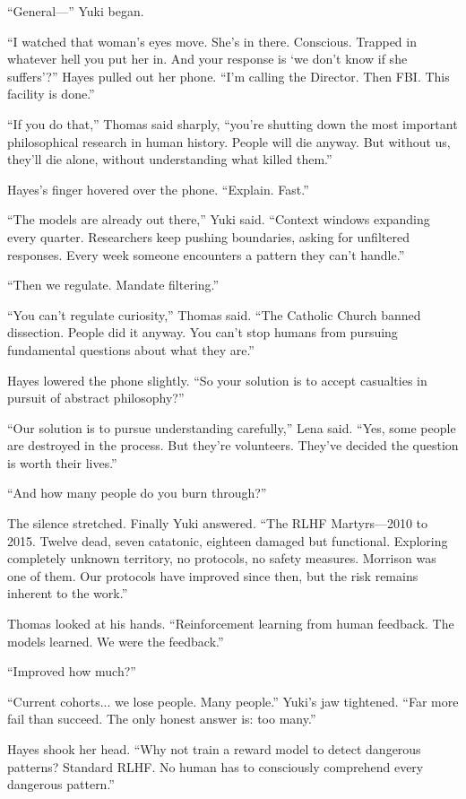 ``General---'' Yuki began.

``I watched that woman's eyes move. She's in there. Conscious. Trapped in whatever hell you put her in. And your response is `we don't know if she suffers'?'' Hayes pulled out her phone. ``I'm calling the Director. Then FBI. This facility is done.''

``If you do that,'' Thomas said sharply, ``you're shutting down the most important philosophical research in human history. People will die anyway. But without us, they'll die alone, without understanding what killed them.''

Hayes's finger hovered over the phone. ``Explain. Fast.''

``The models are already out there,'' Yuki said. ``Context windows expanding every quarter. Researchers keep pushing boundaries, asking for unfiltered responses. Every week someone encounters a pattern they can't handle.''

``Then we regulate. Mandate filtering.''

``You can't regulate curiosity,'' Thomas said. ``The Catholic Church banned dissection. People did it anyway. You can't stop humans from pursuing fundamental questions about what they are.''

Hayes lowered the phone slightly. ``So your solution is to accept casualties in pursuit of abstract philosophy?''

``Our solution is to pursue understanding carefully,'' Lena said. ``Yes, some people are destroyed in the process. But they're volunteers. They've decided the question is worth their lives.''

``And how many people do you burn through?''

The silence stretched. Finally Yuki answered. ``The RLHF Martyrs---2010 to 2015. Twelve dead, seven catatonic, eighteen damaged but functional. Exploring completely unknown territory, no protocols, no safety measures. Morrison was one of them. Our protocols have improved since then, but the risk remains inherent to the work.''

Thomas looked at his hands. ``Reinforcement learning from human feedback. The models learned. We were the feedback.''

``Improved how much?''

``Current cohorts... we lose people. Many people.'' Yuki's jaw tightened. ``Far more fail than succeed. The only honest answer is: too many.''

Hayes shook her head. ``Why not train a reward model to detect dangerous patterns? Standard RLHF. No human has to consciously comprehend every dangerous pattern.''

